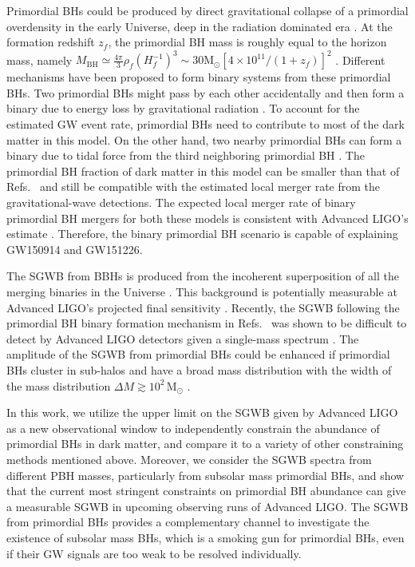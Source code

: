 Primordial \acp{BH} could be produced by direct gravitational collapse of a primordial overdensity in the early Universe, deep in the radiation dominated era \cite{Hawking:1971ei,Carr:1974nx,GarciaBellido:1996qt,Clesse:2015wea,Dolgov:2013lba}.
At the formation redshift $z_f$, the primordial \ac{BH} mass is roughly equal to the horizon mass, namely $M_{\textrm{BH}}\simeq\frac{4\pi}{3}{\rho_{f}}(H^{-1}_{f})^{3}\sim30\mathrm{M}_{\odot}[4\times10^{11}/(1+z_{f})]^{2}$ \cite{Sasaki:2016jop}.
Different mechanisms have been proposed to form binary systems from these primordial \acp{BH}.
Two primordial \acp{BH} might pass by each other accidentally and then form a binary due to energy loss by gravitational radiation \cite{Bird:2016dcv,Clesse:2016vqa}.
To account for the estimated \ac{GW} event rate, primordial \acp{BH} need to contribute to most of the dark matter in this model.
On the other hand, two nearby primordial \acp{BH} can form a binary due to tidal force from the third neighboring primordial \ac{BH} \cite{Sasaki:2016jop,Nakamura:1997sm}.
The primordial \ac{BH} fraction of dark matter in this model can be smaller than that of Refs.~\cite{Bird:2016dcv,Clesse:2016vqa} and still be compatible with the estimated local merger rate from the gravitational-wave detections.
The expected local merger rate of binary primordial \ac{BH} mergers for both these models is consistent with Advanced LIGO's estimate \cite{Bird:2016dcv,Clesse:2016vqa,Sasaki:2016jop}.
Therefore, the binary primordial \ac{BH} scenario is capable of explaining GW150914 and GW151226.

The \ac{SGWB} from \acp{BBH} is produced from the incoherent superposition of all the merging binaries in the Universe \cite{Regimbau:2011rp,Zhu:2011bd,Wu:2011ac,Zhu:2012xw,Wu:2013xfa,Marassi:2011si,Rosado:2011kv,TheLIGOScientific:2016wyq,TheLIGOScientific:2016dpb}.
This background is potentially measurable at Advanced LIGO's projected final sensitivity \cite{TheLIGOScientific:2016wyq}.
Recently, the \ac{SGWB} following the primordial \ac{BH} binary formation mechanism in Refs.~\cite{Bird:2016dcv,Clesse:2016vqa} was shown to be difficult to detect by Advanced LIGO detectors given a single-mass spectrum \cite{Mandic:2016lcn}.
The amplitude of the \ac{SGWB} from primordial \acp{BH} could be enhanced if primordial \acp{BH} cluster in sub-halos and have a broad mass distribution with the width of the mass distribution $\Delta M\gtrsim10^2\,\mathrm{M}_\odot$ \cite{Clesse:2016ajp}.

In this work, we utilize the upper limit on the \ac{SGWB} given by Advanced LIGO as a new observational window to independently constrain the abundance of primordial \acp{BH} in dark matter, and compare it to a variety of other constraining methods mentioned above.
Moreover, we consider the \ac{SGWB} spectra from different PBH masses, particularly from subsolar mass primordial \acp{BH}, and show that the current most stringent constraints on primordial \ac{BH} abundance can give a measurable \ac{SGWB} in upcoming observing runs of Advanced LIGO. The \ac{SGWB} from primordial \acp{BH} provides a complementary channel to investigate the existence of subsolar mass \acp{BH}, which is a smoking gun for primordial \acp{BH}, even if their \ac{GW} signals are too weak to be resolved individually.

